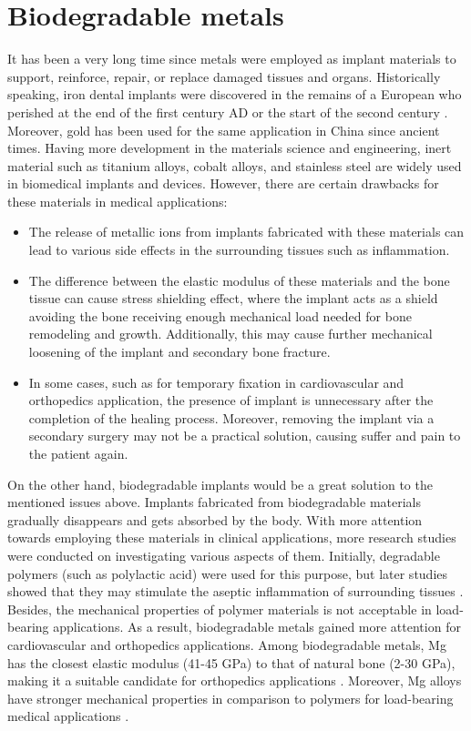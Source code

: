 \section{Biodegradable metals}

It has been a very long time since metals were employed as implant materials to support, reinforce, repair, or replace damaged tissues and organs. Historically speaking, iron dental implants were discovered in the remains of a European who perished at the end of the first century AD or the start of the second century \cite{Crubzy1998}. Moreover, gold has been used for the same application in China since ancient times. Having more development in the materials science and engineering, inert material such as titanium alloys, cobalt alloys, and stainless steel are widely used in biomedical implants and devices. However, there are certain drawbacks for these materials in medical applications:

\begin{itemize}
\item
The release of metallic ions from implants fabricated with these materials can lead to various side effects in the surrounding tissues such as inflammation.
\item
The difference between the elastic modulus of these materials and the bone tissue can cause stress shielding effect, where the implant acts as a shield avoiding the bone receiving enough mechanical load needed for bone remodeling and growth. Additionally, this may cause further mechanical loosening of the implant and secondary bone fracture.
\item
In some cases, such as for temporary fixation in cardiovascular and orthopedics application, the presence of implant is unnecessary after the completion of the healing process. Moreover, removing the implant via a secondary surgery may not be a practical solution, causing suffer and pain to the patient again.
\end{itemize}

On the other hand, biodegradable implants would be a great solution to the mentioned issues above. Implants fabricated from biodegradable materials gradually disappears and gets absorbed by the body. With more attention towards employing these materials in clinical applications, more research studies were conducted on investigating various aspects of them. Initially, degradable polymers (such as polylactic acid) were used for this purpose, but later studies showed that they may stimulate the aseptic inflammation of surrounding tissues \cite{Gao2022}. Besides, the mechanical properties of polymer materials is not acceptable in load-bearing applications. As a result, biodegradable metals gained more attention for cardiovascular and orthopedics applications. Among biodegradable metals, Mg has the closest elastic modulus (41-45 GPa) to that of natural bone (2-30 GPa), making it a suitable candidate for orthopedics applications \cite{Wang2020a}. Moreover, Mg alloys have stronger mechanical properties in comparison to polymers for load-bearing medical applications \cite{Han2019}.


